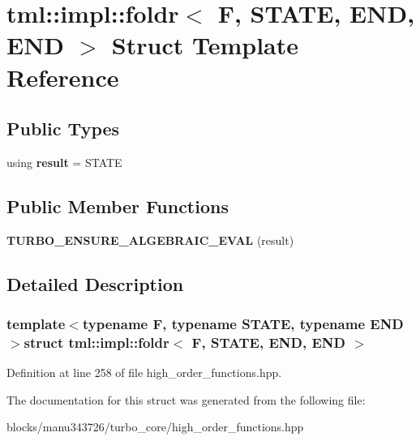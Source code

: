 \hypertarget{structtml_1_1impl_1_1foldr_3_01_f_00_01_s_t_a_t_e_00_01_e_n_d_00_01_e_n_d_01_4}{\section{tml\+:\+:impl\+:\+:foldr$<$ F, S\+T\+A\+T\+E, E\+N\+D, E\+N\+D $>$ Struct Template Reference}
\label{structtml_1_1impl_1_1foldr_3_01_f_00_01_s_t_a_t_e_00_01_e_n_d_00_01_e_n_d_01_4}
}
\subsection*{Public Types}
\begin{DoxyCompactItemize}
\item 
\hypertarget{structtml_1_1impl_1_1foldr_3_01_f_00_01_s_t_a_t_e_00_01_e_n_d_00_01_e_n_d_01_4_a6f78e30bde2fd079eeb9f26bcd66ac66}{using {\bfseries result} = S\+T\+A\+T\+E}\label{structtml_1_1impl_1_1foldr_3_01_f_00_01_s_t_a_t_e_00_01_e_n_d_00_01_e_n_d_01_4_a6f78e30bde2fd079eeb9f26bcd66ac66}

\end{DoxyCompactItemize}
\subsection*{Public Member Functions}
\begin{DoxyCompactItemize}
\item 
\hypertarget{structtml_1_1impl_1_1foldr_3_01_f_00_01_s_t_a_t_e_00_01_e_n_d_00_01_e_n_d_01_4_a558ee332078ee1ae1bcf11e35f7961b6}{{\bfseries T\+U\+R\+B\+O\+\_\+\+E\+N\+S\+U\+R\+E\+\_\+\+A\+L\+G\+E\+B\+R\+A\+I\+C\+\_\+\+E\+V\+A\+L} (result)}\label{structtml_1_1impl_1_1foldr_3_01_f_00_01_s_t_a_t_e_00_01_e_n_d_00_01_e_n_d_01_4_a558ee332078ee1ae1bcf11e35f7961b6}

\end{DoxyCompactItemize}


\subsection{Detailed Description}
\subsubsection*{template$<$typename F, typename S\+T\+A\+T\+E, typename E\+N\+D$>$struct tml\+::impl\+::foldr$<$ F, S\+T\+A\+T\+E, E\+N\+D, E\+N\+D $>$}



Definition at line 258 of file high\+\_\+order\+\_\+functions.\+hpp.



The documentation for this struct was generated from the following file\+:\begin{DoxyCompactItemize}
\item 
blocks/manu343726/turbo\+\_\+core/high\+\_\+order\+\_\+functions.\+hpp\end{DoxyCompactItemize}

